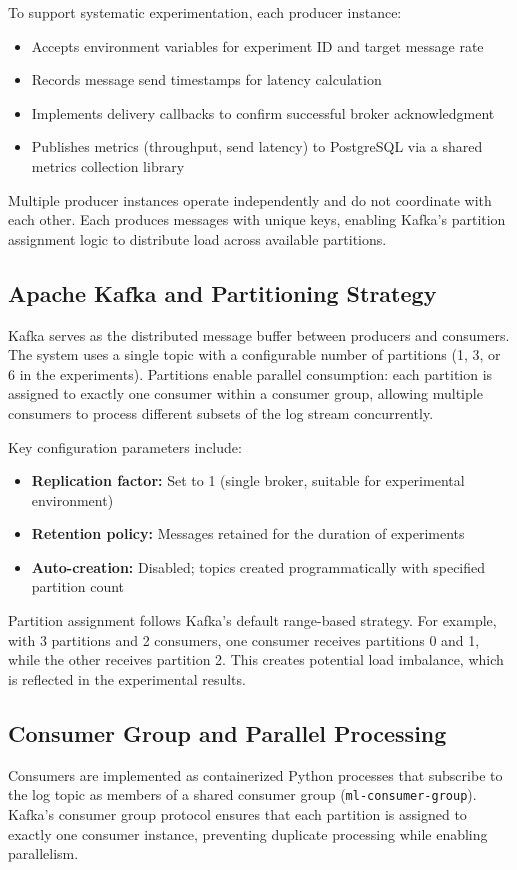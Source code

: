 \documentclass[12pt,a4paper]{report}
\begin{document}
To support systematic experimentation, each producer instance:
\begin{itemize}
    \item Accepts environment variables for experiment ID and target message rate
    \item Records message send timestamps for latency calculation
    \item Implements delivery callbacks to confirm successful broker acknowledgment
    \item Publishes metrics (throughput, send latency) to PostgreSQL via a shared metrics collection library
\end{itemize}

Multiple producer instances operate independently and do not coordinate with each other. Each produces messages with unique keys, enabling Kafka's partition assignment logic to distribute load across available partitions.

\subsection{Apache Kafka and Partitioning Strategy}

Kafka serves as the distributed message buffer between producers and consumers. The system uses a single topic with a configurable number of partitions (1, 3, or 6 in the experiments). Partitions enable parallel consumption: each partition is assigned to exactly one consumer within a consumer group, allowing multiple consumers to process different subsets of the log stream concurrently.

Key configuration parameters include:
\begin{itemize}
    \item \textbf{Replication factor:} Set to 1 (single broker, suitable for experimental environment)
    \item \textbf{Retention policy:} Messages retained for the duration of experiments
    \item \textbf{Auto-creation:} Disabled; topics created programmatically with specified partition count
\end{itemize}

Partition assignment follows Kafka's default range-based strategy. For example, with 3 partitions and 2 consumers, one consumer receives partitions 0 and 1, while the other receives partition 2. This creates potential load imbalance, which is reflected in the experimental results.

\subsection{Consumer Group and Parallel Processing}
\label{sec:consumer-impl}
Consumers are implemented as containerized Python processes that subscribe to the log topic as members of a shared consumer group (\texttt{ml-consumer-group}). Kafka's consumer group protocol ensures that each partition is assigned to exactly one consumer instance, preventing duplicate processing while enabling parallelism.
\end{document}
